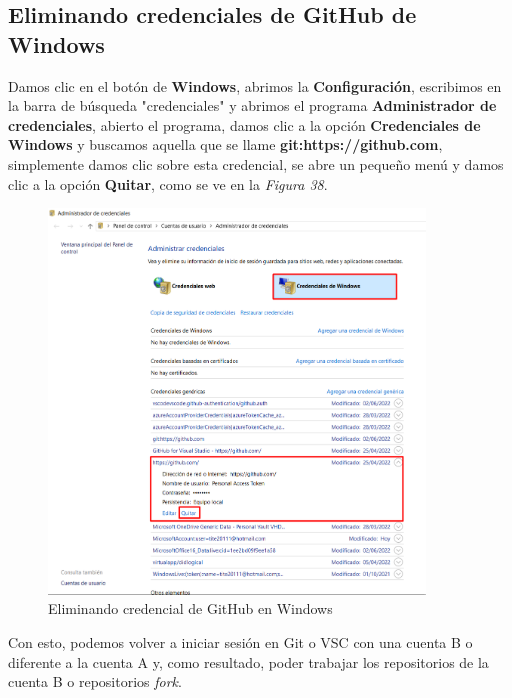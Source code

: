 \subsection{Eliminando credenciales de GitHub de Windows}
Damos clic en el botón de \textbf{Windows}, abrimos la \textbf{Configuración}, escribimos en la barra de búsqueda "credenciales" y abrimos el programa \textbf{Administrador de credenciales}, abierto el programa, damos clic a la opción \textbf{Credenciales de Windows} y buscamos aquella que se llame \textbf{git:https://github.com}, simplemente damos clic sobre esta credencial, se abre un pequeño menú y damos clic a la opción \textbf{Quitar}, como se ve en la \textit{Figura 38}.
\begin{figure}[H]
    \begin{center}
        \caption{Eliminando credencial de GitHub en Windows}
        \label{fig: 38}
        \includegraphics[width=10cm]{capturas/credencial.png}
    \end{center}
\end{figure}

Con esto, podemos volver a iniciar sesión en Git o VSC con una cuenta B o diferente a la cuenta A y, como resultado, poder trabajar los repositorios de la cuenta B o repositorios \textit{fork}.
